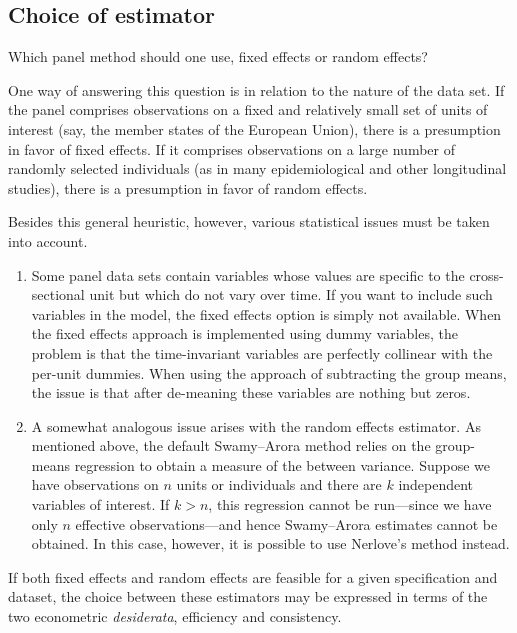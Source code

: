 \subsection{Choice of estimator}
\label{panel-choice}

Which panel method should one use, fixed effects or random effects?

One way of answering this question is in relation to the nature of the
data set.  If the panel comprises observations on a fixed and
relatively small set of units of interest (say, the member states of
the European Union), there is a presumption in favor of fixed effects.
If it comprises observations on a large number of randomly selected
individuals (as in many epidemiological and other longitudinal
studies), there is a presumption in favor of random effects.

Besides this general heuristic, however, various statistical
issues must be taken into account.

\begin{enumerate}

\item Some panel data sets contain variables whose values are specific
  to the cross-sectional unit but which do not vary over time.  If you
  want to include such variables in the model, the fixed effects
  option is simply not available.  When the fixed effects approach is
  implemented using dummy variables, the problem is that the
  time-invariant variables are perfectly collinear with the per-unit
  dummies.  When using the approach of subtracting the group means,
  the issue is that after de-meaning these variables are nothing but
  zeros.
\item A somewhat analogous issue arises with the random effects
  estimator.  As mentioned above, the default Swamy--Arora method
  relies on the group-means regression to obtain a measure of the
  between variance. Suppose we have observations on $n$ units or
  individuals and there are $k$ independent variables of interest.  If
  $k>n$, this regression cannot be run---since we have only $n$
  effective observations---and hence Swamy--Arora estimates cannot be
  obtained. In this case, however, it is possible to use Nerlove's
  method instead.
\end{enumerate}

If both fixed effects and random effects are feasible for a given
specification and dataset, the choice between these estimators may
be expressed in terms of the two econometric \textit{desiderata},
efficiency and consistency.

